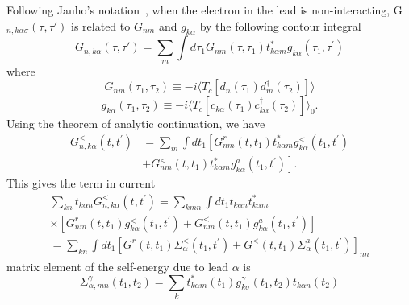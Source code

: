 \documentclass[11pt,a4paper]{book}
\begin{document}
Following Jauho's notation~\cite{Jauho}, when the electron in the lead is non-interacting, G$_{n,k\alpha\sigma}(\tau,\tau')$ is related to $G_{nm}$ and $g_{k\alpha}$ by the following contour integral
\begin{equation}
G_{n,k\alpha}(\tau,\tau')=\sum_{m} \int d \tau_{1} G_{n m}\left(\tau, \tau_{1}\right) t_{k \alpha m}^{*} g_{k \alpha}\left(\tau_{1}, \tau^{\prime}\right)
\end{equation}
where
\begin{equation}
G_{n m}\left(\tau_{1}, \tau_{2}\right) \equiv-i \langle T_{c} \left[d_{n} \left(\tau_{1}\right) d_{m}^{\dagger}\left(\tau_{2}\right)\right]\rangle
\end{equation}
\begin{equation}
g_{k \alpha}\left(\tau_{1}, \tau_{2}\right) \equiv-i \langle T_{c}\left[c_{k \alpha}\left(\tau_{1}\right) c_{k \alpha}^{\dagger}\left(\tau_{2}\right)\right] \rangle_{0}.
\end{equation}
Using the theorem of analytic continuation, we have
\begin{equation}
\begin{aligned}
G_{n, k \alpha}^{<}\left(t, t^{\prime}\right) &=\sum_{m} \int d t_{1}\left[G_{n m}^{r}\left(t, t_{1}\right) t_{k \alpha m}^{*} g_{k \alpha}^{<}\left(t_{1}, t^{\prime}\right)\right.\\
&\left.+G_{n m}^{<}\left(t, t_{1}\right) t_{k \alpha m}^{*} g_{k \alpha}^{a}\left(t_{1}, t^{\prime}\right)\right].
\end{aligned}
\end{equation}
This gives the term in current
\begin{equation}
\begin{array}{l}
\sum_{kn} t_{k \alpha n} G_{n, k \alpha}^{<}\left(t, t^{\prime}\right)=\sum_{k mn} \int d t_{1} t_{k \alpha n} t_{k \alpha m}^{*} \\
\times\left[G_{n m}^{r}\left(t, t_{1}\right) g_{k \alpha}^{<}\left(t_{1}, t^{\prime}\right)+G_{n m}^{<}\left(t, t_{1}\right) g_{k \alpha}^{a}\left(t_{1}, t^{\prime}\right)\right] \\
=\sum_{kn}\int d t_{1}\left[G^{r}\left(t, t_{1}\right) \Sigma_{\alpha}^{<}\left(t_{1}, t^{\prime}\right)+G^{<}\left(t, t_{1}\right) \Sigma_{\alpha}^{a}\left(t_{1}, t^{\prime}\right)\right]_{n n}
\end{array}
\end{equation}
matrix element of the self-energy due to lead $\alpha$ is
\begin{equation}
\Sigma_{\alpha,mn}^{\gamma}(t_{1}, t_{2}) = \sum_{k} t_{k\alpha m}^{*}(t_{1}) g_{k\sigma}^{\gamma}(t_{1}, t_{2}) t_{k\alpha n}(t_{2})
\end{equation}
\end{document}
